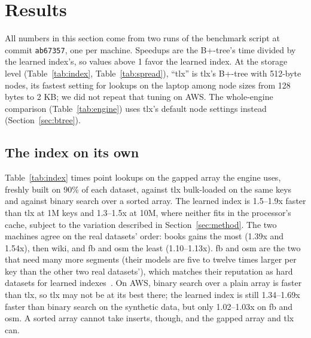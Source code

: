 \documentclass[conference]{IEEEtran}
\begin{document}
\section{Results}
\label{sec:results}

All numbers in this section come from two runs of the benchmark script at
commit \texttt{ab67357}, one per machine. Speedups are the B+-tree's time
divided by the learned index's, so values above 1 favor the learned
index. At the storage level (Table~\ref{tab:index}, Table~\ref{tab:spread}),
``tlx'' is tlx's B+-tree with 512-byte nodes, its fastest setting for lookups on
the laptop among node sizes from 128 bytes to 2 KB; we did not repeat that tuning
on AWS. The whole-engine comparison (Table~\ref{tab:engine}) uses tlx's default
node settings instead (Section~\ref{sec:btree}).

\subsection{The index on its own}

Table~\ref{tab:index} times point lookups on the gapped array the engine
uses, freshly built on 90\% of each dataset, against tlx bulk-loaded on
the same keys and against binary search over a sorted array. The learned
index is 1.5--1.9x faster than tlx at 1M keys and 1.3--1.5x at 10M,
where neither fits in the processor's cache, subject to the variation
described in Section~\ref{sec:method}. The two machines agree on the real
datasets' order: books gains the most (1.39x and 1.54x), then wiki, and fb and
osm the least (1.10--1.13x). fb and osm are the two that need many more
segments (their models are five to twelve times larger per key than the other
two real datasets'), which matches their reputation as hard datasets for
learned indexes~\cite{marcus2020}. On AWS, binary search over a plain array is
faster than tlx, so tlx may not be at its best there; the learned index is
still 1.34--1.69x faster than binary search on the synthetic data, but only
1.02--1.03x on fb and osm. A sorted array cannot take inserts, though, and the
gapped array and tlx can.
\end{document}
